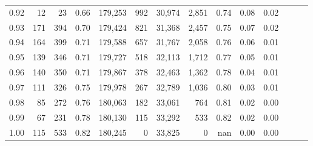 \begin{tabular}{rrrrrrrrrrrrrr}
0.92 &     12 &   23 &  0.66 &  179,253 &      992 &  30,974 &   2,851 &  0.74 &  0.08 &      0.02 \\
0.93 &    171 &  394 &  0.70 &  179,424 &      821 &  31,368 &   2,457 &  0.75 &  0.07 &      0.02 \\
0.94 &    164 &  399 &  0.71 &  179,588 &      657 &  31,767 &   2,058 &  0.76 &  0.06 &      0.01 \\
0.95 &    139 &  346 &  0.71 &  179,727 &      518 &  32,113 &   1,712 &  0.77 &  0.05 &      0.01 \\
0.96 &    140 &  350 &  0.71 &  179,867 &      378 &  32,463 &   1,362 &  0.78 &  0.04 &      0.01 \\
0.97 &    111 &  326 &  0.75 &  179,978 &      267 &  32,789 &   1,036 &  0.80 &  0.03 &      0.01 \\
0.98 &     85 &  272 &  0.76 &  180,063 &      182 &  33,061 &     764 &  0.81 &  0.02 &      0.00 \\
0.99 &     67 &  231 &  0.78 &  180,130 &      115 &  33,292 &     533 &  0.82 &  0.02 &      0.00 \\
1.00 &    115 &  533 &  0.82 &  180,245 &        0 &  33,825 &       0 &   nan &  0.00 &      0.00 \\
\bottomrule
\end{tabular}

